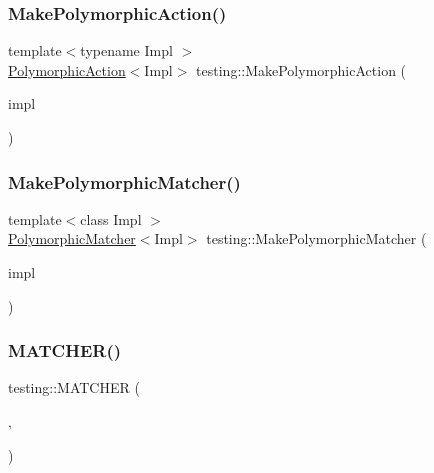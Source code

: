 \mbox{\label{namespacetesting_a36bd06c5ea972c6df0bd9f40a7a94c65}} 
\subsubsection{\texorpdfstring{Make\+Polymorphic\+Action()}{MakePolymorphicAction()}}
{\footnotesize\ttfamily template$<$typename Impl $>$ \\
\hyperlink{classtesting_1_1_polymorphic_action}{Polymorphic\+Action}$<$Impl$>$ testing\+::\+Make\+Polymorphic\+Action (\begin{DoxyParamCaption}\item[{const Impl \&}]{impl }\end{DoxyParamCaption})\hspace{0.3cm}{\ttfamily [inline]}}

\mbox{\label{namespacetesting_a667ca94f190ec2e17ee2fbfdb7d3da04}} 
\subsubsection{\texorpdfstring{Make\+Polymorphic\+Matcher()}{MakePolymorphicMatcher()}}
{\footnotesize\ttfamily template$<$class Impl $>$ \\
\hyperlink{classtesting_1_1_polymorphic_matcher}{Polymorphic\+Matcher}$<$Impl$>$ testing\+::\+Make\+Polymorphic\+Matcher (\begin{DoxyParamCaption}\item[{const Impl \&}]{impl }\end{DoxyParamCaption})\hspace{0.3cm}{\ttfamily [inline]}}

\mbox{\label{namespacetesting_a4fcb3f407119590471bea5a90a8d2dda}} 
\subsubsection{\texorpdfstring{M\+A\+T\+C\+H\+E\+R()}{MATCHER()}}
{\footnotesize\ttfamily testing\+::\+M\+A\+T\+C\+H\+ER (\begin{DoxyParamCaption}\item[{Is\+Empty}]{,  }\item[{negation ? \char`\"{}isn\textquotesingle{}t empty\char`\"{} \+:\char`\"{}is empty\char`\"{}}]{ }\end{DoxyParamCaption})}


